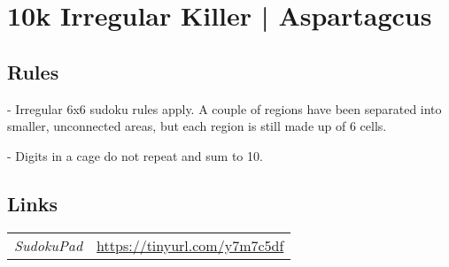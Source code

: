 \section[10k Irregular Killer | Aspartagcus {[\emph{Irregular Killer Sudoku}]}]{10k Irregular Killer | {\normalfont Aspartagcus}}
\label{sec:44-10k-irregular-killer-aspartagcus}

\subsection*{Rules}
\begin{markdown}
- Irregular 6x6 sudoku rules apply. A couple of regions have been separated into smaller, unconnected areas, but each region is still made up of 6 cells.

- Digits in a cage do not repeat and sum to 10.
\end{markdown}
\subsection*{Links}
\begin{tabularx}{\textwidth}{l X}
\emph{SudokuPad} & \url{https://tinyurl.com/y7m7c5df} \\
\end{tabularx}
\pagebreak
